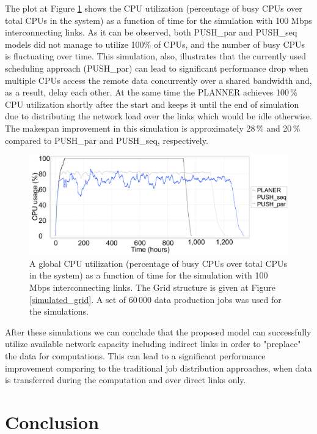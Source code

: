 \documentclass{svjour3}                     %
\begin{document}
The plot at Figure \ref{multi_cpu_consumption} shows the CPU utilization (percentage of busy CPUs over total CPUs in the system) as a function of time for the simulation with 100 Mbps interconnecting links. As it can be observed, both PUSH\_par and PUSH\_seq models did not manage to utilize 100\% of CPUs, and the number of busy CPUs is fluctuating over time. This simulation, also, illustrates that the currently used scheduling approach (PUSH\_par) can lead to significant performance drop when multiple CPUs access the remote data concurrently over a shared bandwidth and, as a result, delay each other. At the same time the PLANNER achieves 100\,\% CPU utilization shortly after the start and keeps it until the end of simulation due to distributing the network load over the links which would be idle otherwise. The makespan improvement in this simulation is approximately 28\,\% and 20\,\% compared to PUSH\_par and PUSH\_seq, respectively.
\begin{figure}
  \begin{center}
    \includegraphics [trim= 0mm 00mm 0mm 00mm , clip,width=1\textwidth]{pic/3models_link01.png}
    \caption{A global CPU utilization (percentage of busy CPUs over total CPUs in the system) as a function of time for the simulation with 100 Mbps interconnecting links. The Grid structure is given at Figure \ref{simulated_grid}. A set of 60\,000 data production jobs was used for the simulations.}
      \label{multi_cpu_consumption}	
  \end{center}  
\end{figure}

After these simulations we can conclude that the proposed model can successfully utilize available network capacity including indirect links in order to "preplace" the data for computations. This can lead to a significant performance improvement comparing to the traditional job distribution approaches, when data is transferred during the computation and over direct links only. 

\section{Conclusion}
\label{Conclusion}
\end{document}
